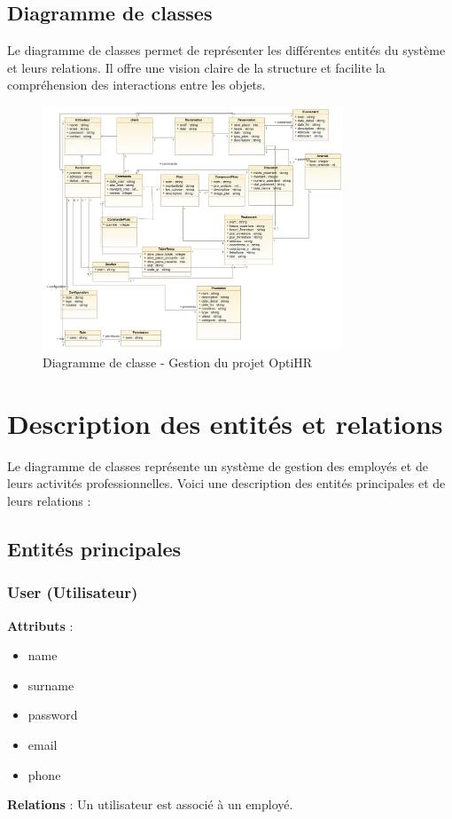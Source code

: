 \subsection{Diagramme de classes}
Le diagramme de classes permet de représenter les différentes entités du
système et leurs relations. Il offre une vision claire de la structure et
facilite la compréhension des interactions entre les objets.

\begin{figure}[H]
    \centering
    \includegraphics[width=0.8\textwidth]{images/diagrammes/class/diag.png}
    \caption{Diagramme de classe - Gestion du projet OptiHR}
    \label{fig:class_diagramm_optiRH}
\end{figure}

\section{Description des entités et relations}

Le diagramme de classes représente un système de gestion des employés et de
leurs activités professionnelles. Voici une description des entités principales
et de leurs relations :

\subsection{Entités principales}

\subsubsection{User (Utilisateur)}
\textbf{Attributs} :
\begin{itemize}
    \item name
    \item surname
    \item password
    \item email
    \item phone
\end{itemize}
\textbf{Relations} : Un utilisateur est associé à un employé.

